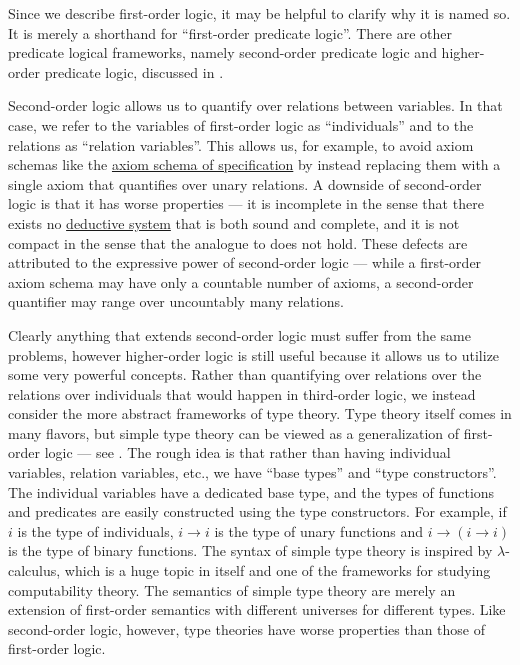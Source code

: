 \begin{remark}\label{rem:higher_order_logic}
  Since we describe first-order logic, it may be helpful to clarify why it is named so. It is merely a shorthand for \enquote{first-order predicate logic}. There are other predicate logical frameworks, namely second-order predicate logic and higher-order predicate logic, discussed in \cite[sec. 3.6]{Hinman2005}.

  Second-order logic allows us to quantify over relations between variables. In that case, we refer to the variables of first-order logic as \enquote{individuals} and to the relations as \enquote{relation variables}. This allows us, for example, to avoid axiom schemas like the \hyperref[def:zfc/specification]{axiom schema of specification} by instead replacing them with a single axiom that quantifies over unary relations. A downside of second-order logic is that it has worse properties --- it is incomplete in the sense that there exists no \hyperref[def:deductive_system]{deductive system} that is both sound and complete, and it is not compact in the sense that the analogue to  does not hold. These defects are attributed to the expressive power of second-order logic --- while a first-order axiom schema may have only a countable number of axioms, a second-order quantifier may range over uncountably many relations.

  Clearly anything that extends second-order logic must suffer from the same problems, however higher-order logic is still useful because it allows us to utilize some very powerful concepts. Rather than quantifying over relations over the relations over individuals that would happen in third-order logic, we instead consider the more abstract frameworks of type theory. Type theory itself comes in many flavors, but simple type theory can be viewed as a generalization of first-order logic --- see \cite[thm. 2]{Farmer2008}. The rough idea is that rather than having individual variables, relation variables, etc., we have \enquote{base types} and \enquote{type constructors}. The individual variables have a dedicated base type, and the types of functions and predicates are easily constructed using the type constructors. For example, if \( i \) is the type of individuals, \( i \rightarrow i \) is the type of unary functions and \( i \rightarrow (i \rightarrow i) \) is the type of binary functions. The syntax of simple type theory is inspired by \( \lambda \)-calculus, which is a huge topic in itself and one of the frameworks for studying computability theory. The semantics of simple type theory are merely an extension of first-order semantics with different universes for different types. Like second-order logic, however, type theories have worse properties than those of first-order logic.


\end{remark}
